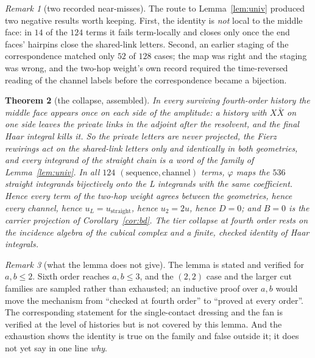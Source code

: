 \documentclass[11pt]{article}
\newtheorem{theorem}{Theorem}[section]
\theoremstyle{definition}
\theoremstyle{remark}
\newtheorem{remark}[theorem]{Remark}
\newcommand{\chk}[1]{}
\begin{document}
\begin{remark}[two recorded near-misses]
The route to Lemma~\ref{lem:univ} produced two negative results worth keeping.
First, the identity is \emph{not} local to the middle face: in $14$ of the
$124$ terms it fails term-locally and closes only once the end faces' hairpins
close the shared-link letters. Second, an earlier staging of the correspondence
matched only $52$ of $128$ cases; the map was right and the staging was wrong,
and the two-hop weight's own record required the time-reversed reading of the
channel labels before the correspondence became a bijection.
\end{remark}

\begin{theorem}[the collapse, assembled]\label{thm:mechanism}
In every surviving fourth-order history the middle face appears once on each
side of the amplitude: a history with $X\bar X$ on one side leaves the private
links in the adjoint after the resolvent, and the final Haar integral kills it.
So the private letters are never projected, the Fierz rewirings act on the
shared-link letters only and identically in both geometries, and every
integrand of the straight chain is a word of the family of
Lemma~\ref{lem:univ}. In all $124$ $(\text{sequence},\text{channel})$ terms,
$\varphi$ maps the $536$ straight integrands bijectively onto the L integrands
with the same coefficient. Hence every term of the two-hop weight agrees
between the geometries, hence every channel, hence $u_L=u_{\mathrm{straight}}$,
hence $u_2=2u$, hence $D=0$; and $B=0$ is the carrier projection of
Corollary~\ref{cor:bd}. The tier collapse at fourth order rests on the
incidence algebra of the cubical complex and a finite, checked identity of Haar
integrals.\chk{where the identity lives: after every private path is integrated, the straight and the L chain leave the same formal word in the two shared links, coefficient for coefficient, in every (sequence, channel) term; after the middle face's private links alone they do not}
\end{theorem}

\begin{remark}[what the lemma does not give]
The lemma is stated and verified for $a,b\le2$. Sixth order reaches $a,b\le3$,
and the $(2,2)$ case and the larger cut families are sampled rather than
exhausted; an inductive proof over $a,b$ would move the mechanism from
``checked at fourth order'' to ``proved at every order''. The corresponding
statement for the single-contact dressing and the fan is verified at the level
of histories but is not covered by this lemma. And the exhaustion shows the
identity is true on the family and false outside it; it does not yet say in one
line \emph{why}.
\end{remark}
\end{document}
